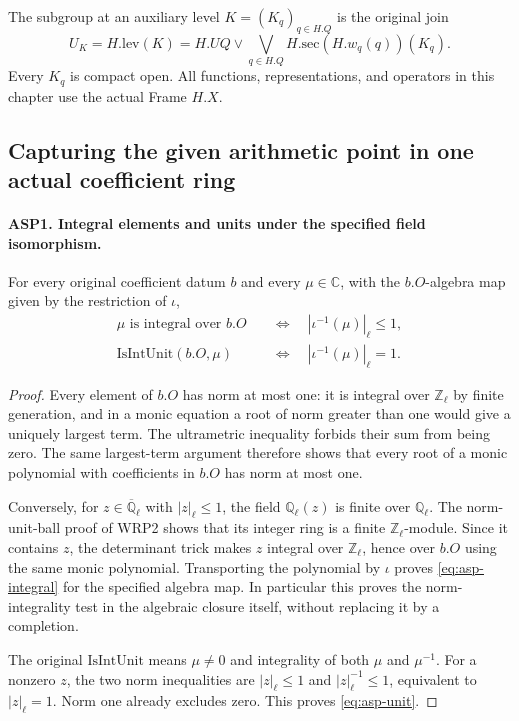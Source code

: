 The subgroup at an auxiliary level $K=(K_q)_{q\in H.Q}$
is the original join
\begin{equation}\label{eq:asp-level}
       U_K=H.\mathrm{lev}(K)
          =H.UQ\vee\bigvee_{q\in H.Q}
                            H.\mathrm{sec}(H.w_q(q))(K_q).
\end{equation}
Every $K_q$ is compact open.  All functions, representations,
and operators in this chapter use the actual Frame $H.X$.

\subsection{Capturing the given arithmetic point in one actual coefficient ring}

\paragraph{ASP1. Integral elements and units under the specified field isomorphism.}
\label{claim:ASP1}
For every original coefficient datum $b$ and every
$\mu\in\mathbb C$, with the $b.O$-algebra map given by
the restriction of $\iota$,
\begin{align}
 \mu\text{ is integral over }b.O
       &\quad\Longleftrightarrow\quad|\iota^{-1}(\mu)|_\ell\leq1,
       \label{eq:asp-integral}\\
 \mathrm{IsIntUnit}(b.O,\mu)
       &\quad\Longleftrightarrow\quad|\iota^{-1}(\mu)|_\ell=1.
       \label{eq:asp-unit}
\end{align}
\begin{proof}
Every element of $b.O$ has norm at most one: it is integral
over $\mathbb Z_\ell$ by finite generation, and in a monic
equation a root of norm greater than one would give a
uniquely largest term.  The ultrametric inequality forbids
their sum from being zero.  The same largest-term argument
therefore shows that every root of a monic polynomial with
coefficients in $b.O$ has norm at most one.

Conversely, for $z\in\overline{\mathbb Q}_\ell$ with
$|z|_\ell\leq1$, the field $\mathbb Q_\ell(z)$ is finite
over $\mathbb Q_\ell$.  The norm-unit-ball proof of WRP2
shows that its integer ring is a finite
$\mathbb Z_\ell$-module.  Since it contains $z$, the
determinant trick makes $z$ integral over
$\mathbb Z_\ell$, hence over $b.O$ using the same monic
polynomial.  Transporting the polynomial by $\iota$
proves \eqref{eq:asp-integral} for the specified algebra
map.  In particular this proves the norm-integrality
test in the algebraic closure itself, without replacing
it by a completion.

The original $\mathrm{IsIntUnit}$ means
$\mu\ne0$ and integrality of both $\mu$ and $\mu^{-1}$.
For a nonzero $z$, the two norm inequalities are
$|z|_\ell\leq1$ and $|z|_\ell^{-1}\leq1$, equivalent
to $|z|_\ell=1$.  Norm one already excludes zero.
This proves \eqref{eq:asp-unit}.
\end{proof}

